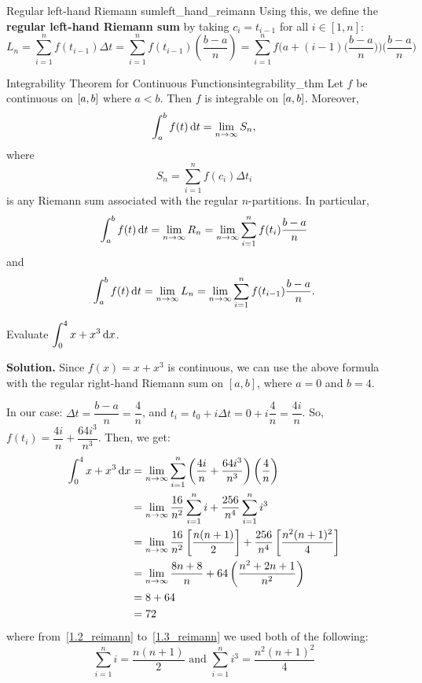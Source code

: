 \begin{Definition}{Regular left-hand Riemann sum}{left_hand_reimann}
    Using this, we define the \textbf{regular left-hand Riemann sum} by taking $ c_i=t_{i-1} $ for
    all $ i\in[1,n] $:
    \[ L_n
        =\sum\limits_{i=1}^{n} f(t_{i-1})\Delta t
        =\sum\limits_{i=1}^{n} f(t_{i-1})\left(\frac{b-a}{n}\right)
        =\sum\limits_{i=1}^{n} f\Biggl(a+(i-1)\biggl(\frac{b-a}{n}\biggr)\Biggr)\biggl(\frac{b-a}{n}\biggr) \]
\end{Definition}

\begin{Theorem}{Integrability Theorem for Continuous Functions}{integrability_thm}
    Let $ f $ be continuous on $ \interval{a}{b} $ where $ a<b $. Then $ f $ is integrable on $ \interval{a}{b} $.
    Moreover,
    \[ \int_{a}^{b}f(t)\odif{t}=\lim\limits_{{n} \to {\infty}}S_n, \]
    where
    \[ S_n=\sum_{i=1}^{n}f(c_i)\Delta t_i \]
    is any Riemann sum associated with the regular $ n $-partitions. In particular,
    \[ \int_{a}^{b}f(t)\odif{t}=\lim\limits_{{n} \to {\infty}}R_n= \lim\limits_{{n} \to {\infty}}\sum_{i=1}^{n}f(t_i)\frac{b-a}{n} \]
    and
    \[ \int_{a}^{b}f(t)\odif{t}=\lim\limits_{{n} \to {\infty}}L_n=\lim\limits_{{n} \to {\infty}}\sum_{i=1}^{n}f(t_{i-1})\frac{b-a}{n}. \]
\end{Theorem}

\begin{Example}{}{}
    Evaluate
    $ \displaystyle\int_{0}^{4} x+x^3\odif{x} $.

    \textbf{Solution.}
    Since $ f(x)=x+x^3 $ is continuous, we can use the above formula with the regular right-hand Riemann sum
    on $ [a,b] $, where $ a=0 $ and $ b=4 $.

    In our case: $ \Delta t=\dfrac{b-a}{n} = \dfrac{4}{n} $, and $ t_i =t_0+i\Delta t=0+i\dfrac{4}{n} = \dfrac{4i}{n} $.
    So, $ f(t_i) = \dfrac{4i}{n} + \dfrac{64i^3}{n^3} $.
    Then, we get:
    \begin{align}
        \int_{0}^{4} x+x^3\odif{x}
         & = \lim\limits_{{n} \to {\infty}} \sum\limits_{i=1}^{n}
        \left( \frac{4i}{n} +\frac{64i^3}{n^3} \right)\left( \frac{4}{n} \right)                  \\
         & = \lim\limits_{{n} \to {\infty}} \frac{16}{n^2} \sum\limits_{i=1}^{n} i +
        \frac{256}{n^4} \sum\limits_{i=1}^{n} i^3 \label{1.2_reimann}                             \\
         & = \lim\limits_{{n} \to {\infty}} \frac{16}{n^2} \left[ \frac{n(n+1)}{2} \right] +
        \frac{256}{n^4} \left[ \frac{n^2(n+1)^2}{4} \right] \label{1.3_reimann}                   \\
         & = \lim\limits_{{n} \to {\infty}} \frac{8n+8}{n} +64 \left(\frac{n^2+2n+1}{n^2} \right) \\
         & = 8+64                                                                                 \\
         & =72
    \end{align}
    where from~\eqref{1.2_reimann} to~\eqref{1.3_reimann} we used both of the following:
    \[ \sum\limits_{i=1}^{n} i=\frac{n(n+1)}{2} \text{ and }
        \sum\limits_{i=1}^{n} i^3=\frac{n^2(n+1)^2}{4} \]
\end{Example}


